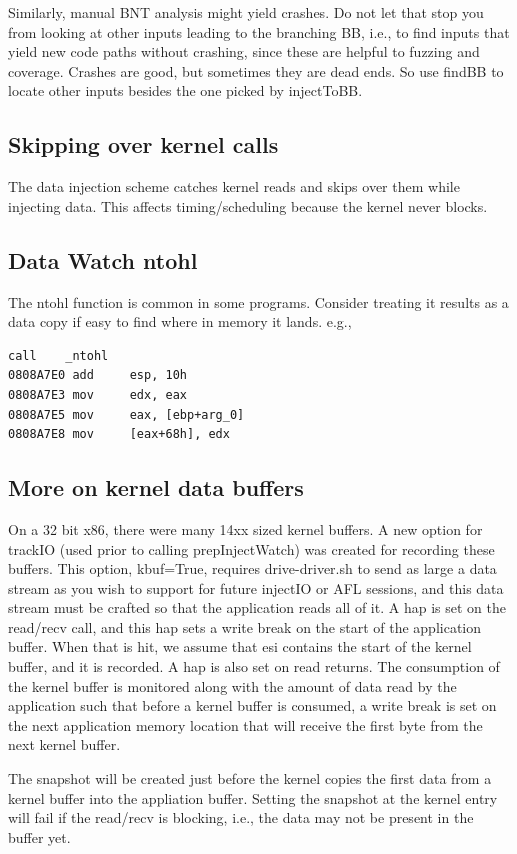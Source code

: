 \documentclass[titlepage]{article}
\begin{document}
\begin{appendices}
Similarly, manual BNT analysis might yield crashes.  Do not let that stop you from looking at other inputs leading to the branching BB, i.e., to find inputs that
yield new code paths without crashing, since these are helpful to fuzzing and coverage.  Crashes are good, but sometimes they are dead ends.  So use findBB to locate other
inputs besides the one picked by injectToBB.


\subsection{Skipping over kernel calls}
The data injection scheme catches kernel reads and skips over them while injecting data.  This affects timing/scheduling because the kernel never
blocks.

\subsection{Data Watch ntohl}
The ntohl function is common in some programs.  Consider treating it results as a data copy if easy to find where in memory it lands. e.g.,
\begin{verbatim}
call    _ntohl
0808A7E0 add     esp, 10h
0808A7E3 mov     edx, eax
0808A7E5 mov     eax, [ebp+arg_0]
0808A7E8 mov     [eax+68h], edx
\end{verbatim}

\subsection{More on kernel data buffers}
On a 32 bit x86, there were many 14xx sized kernel buffers.  A new option for trackIO (used prior to calling prepInjectWatch) was created for recording these buffers.
This option, kbuf=True, requires drive-driver.sh to send as large a data stream as you wish to support for future injectIO or AFL sessions, and this data stream
must be crafted so that the application reads all of it.  A hap is set on the read/recv call, and this hap sets a write break on the start of the application buffer.  When that is hit, we assume that esi contains the start of the kernel buffer, and it is recorded.  A hap is also set on read returns.  The consumption of the
kernel buffer is monitored along with the amount of data read by the application such that before a kernel buffer is consumed, a write break is set on the next 
application memory location that will receive the first byte from the next kernel buffer.

The snapshot will be created just before the kernel copies the first data from a kernel buffer into the appliation buffer.  Setting the snapshot at the kernel entry will fail if the read/recv
is blocking, i.e., the data may not be present in the buffer yet.


\end{appendices}
\end{document}
